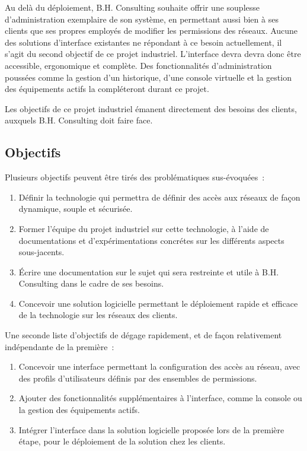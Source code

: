 Au delà du déploiement, B.H. Consulting souhaite offrir une souplesse d'administration exemplaire de son système, en permettant aussi bien à ses clients que ses propres employés de modifier les permissions des réseaux. Aucune des solutions d'interface existantes ne répondant à ce besoin actuellement, il s'agit du second objectif de ce projet industriel. L'interface devra devra donc être accessible, ergonomique et complète. Des fonctionnalités d'administration poussées comme la gestion d'un historique, d'une console virtuelle et la gestion des équipements actifs la compléteront durant ce projet.

Les objectifs de ce projet industriel émanent directement des besoins des clients, auxquels B.H. Consulting doit faire face.

\subsection{Objectifs}

Plusieurs objectifs peuvent être tirés des problématiques sus-évoquées~:

\begin{enumerate}
\item Définir la technologie qui permettra de définir des accès aux réseaux de façon dynamique, souple et sécurisée.
\item Former l'équipe du projet industriel sur cette technologie, à l'aide de documentations et d'expérimentations concrétes sur les différents aspects sous-jacents.
\item Écrire une documentation sur le sujet qui sera restreinte et utile à B.H. Consulting dans le cadre de ses besoins.
\item Concevoir une solution logicielle permettant le déploiement rapide et efficace de la technologie sur les réseaux des clients.
\end{enumerate}

Une seconde liste d'objectifs de dégage rapidement, et de façon relativement indépendante de la première~:

\begin{enumerate}
\item Concevoir une interface permettant la configuration des accès au réseau, avec des profils d'utilisateurs définis par des ensembles de permissions.
\item Ajouter des fonctionnalités supplémentaires à l'interface, comme la console ou la gestion des équipements actifs.
\item Intégrer l'interface dans la solution logicielle proposée lors de la première étape, pour le déploiement de la solution chez les clients.
\end{enumerate}

